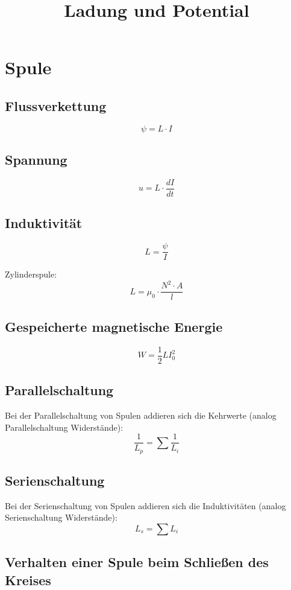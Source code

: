 \documentclass[a4paper,12pt]{article}
\title{Ladung und Potential}
\author{}
\date{}
\begin{document}
	
	\maketitle
	\tableofcontents
	\pagebreak
	
	\section{Spule}
	
	\subsection{Flussverkettung}
	$$\psi = L \cdot I$$
	
	\subsection{Spannung}
	$$u = L \cdot \frac{dI}{dt}$$
	
	\subsection{Induktivität}
	$$L = \frac{\psi}{I}$$
	
	Zylinderspule:
	$$L = \mu_0 \cdot \frac{N^2 \cdot A}{l}$$
	
	\subsection{Gespeicherte magnetische Energie}
	$$W = \frac{1}{2} L I_0^2$$
	
	\subsection{Parallelschaltung}
	Bei der Parallelschaltung von Spulen addieren sich die Kehrwerte (analog Parallelschaltung Widerstände):
	$$\frac{1}{L_p} = \sum \frac{1}{L_i}$$
	
	\subsection{Serienschaltung}
	Bei der Serienschaltung von Spulen addieren sich die Induktivitäten (analog Serienschaltung Widerstände):
	$$L_s = \sum L_i$$
	
	\subsection{Verhalten einer Spule beim Schließen des Kreises}
	
\end{document}
